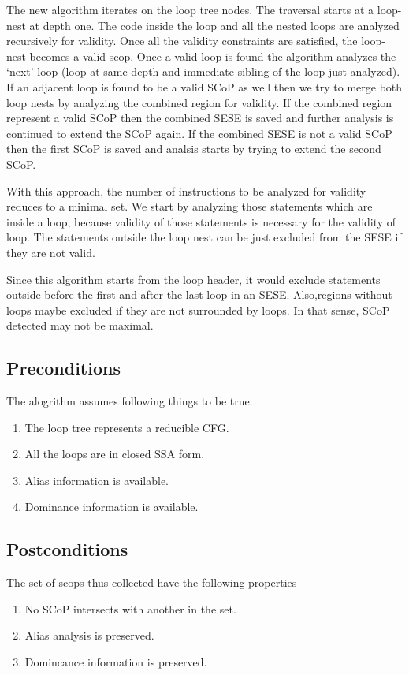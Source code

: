 \documentclass{sigplanconf}
\begin{document}
The new algorithm iterates on the loop tree nodes. The traversal starts at a loop-nest at depth one.
The code inside the loop and all the nested loops are analyzed recursively for validity. Once all the validity
constraints are satisfied, the loop-nest becomes a valid scop. Once a valid loop is found the algorithm analyzes the
`next' loop (loop at same depth and immediate sibling of the loop just analyzed). If an adjacent loop is found to be a
valid SCoP as well then we try to merge both loop nests by analyzing the combined region for validity. If the combined
region represent a valid SCoP then the combined SESE is saved and further analysis is continued to extend the SCoP
again. If the combined SESE is not a valid SCoP then the first SCoP is saved and analsis starts by trying to extend
the second SCoP.

With this approach, the number of instructions to be analyzed for validity reduces to a minimal set.
We start by analyzing those statements which are inside a loop, because validity of those statements is
necessary for the validity of loop. The statements outside the loop nest can be just excluded from the
SESE if they are not valid.

Since this algorithm starts from the loop header, it would exclude statements outside before the first and after the
last loop in an SESE. Also,regions without loops maybe excluded if they are not surrounded by loops.
In that sense, SCoP detected may not be maximal.

\subsection{Preconditions}
The alogrithm assumes following things to be true.
\begin{enumerate}
\item The loop tree represents a reducible CFG.
\item All the loops are in closed SSA form.
\item Alias information is available.
\item Dominance information is available.
\end{enumerate}

\subsection{Postconditions}
The set of scops thus collected have the following properties
\begin{enumerate}
\item No SCoP intersects with another in the set.
\item Alias analysis is preserved.
\item Domincance information is preserved.
\end{enumerate}
\end{document}
